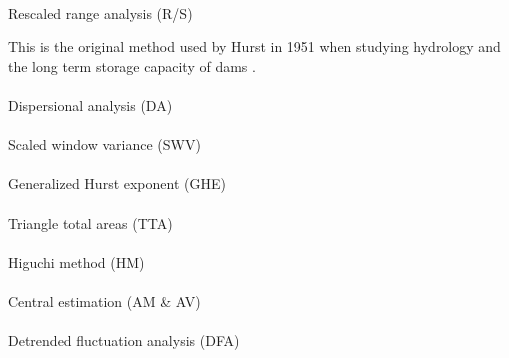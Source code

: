 \documentclass[
  sn-vancouver,
  Numbered,
  referee,
  lineno]{sn-jnl}
\makeatletter
\let\oldparagraph\paragraph
\renewcommand{\paragraph}{
    \@ifstar
      \xxxParagraphStar
      \xxxParagraphNoStar
  }
\newcommand{\xxxParagraphStar}[1]{\oldparagraph*{#1}\mbox{}}
\newcommand{\xxxParagraphNoStar}[1]{\oldparagraph{#1}\mbox{}}
\makeatother
\begin{document}
\paragraph{Rescaled range analysis
(R/S)}\label{rescaled-range-analysis-rs}

This is the original method used by Hurst in 1951 when studying
hydrology and the long term storage capacity of dams
\citep{hurstLongTermStorageCapacity1951}.

\citet{dongHurstExponentAnalysis2018}

\paragraph{Dispersional analysis (DA)}\label{dispersional-analysis-da}

\citep{bassingthwaightePhysiologicalHeterogeneityFractals1988}

\citet{donaTemporalFractalAnalysis2017}
\citet{donaFractalAnalysisBrain2017}

\paragraph{Scaled window variance
(SWV)}\label{scaled-window-variance-swv}

\citet{donaTemporalFractalAnalysis2017}
\citet{donaFractalAnalysisBrain2017}

\paragraph{Generalized Hurst exponent
(GHE)}\label{generalized-hurst-exponent-ghe}

\paragraph{Triangle total areas (TTA)}\label{triangle-total-areas-tta}

\paragraph{Higuchi method (HM)}\label{higuchi-method-hm}

\paragraph{Central estimation (AM \&
AV)}\label{central-estimation-am-av}

\paragraph{Detrended fluctuation analysis
(DFA)}\label{detrended-fluctuation-analysis-dfa}
\end{document}
